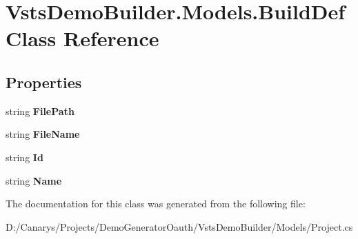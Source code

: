 \hypertarget{class_vsts_demo_builder_1_1_models_1_1_build_def}{}\section{Vsts\+Demo\+Builder.\+Models.\+Build\+Def Class Reference}
\label{class_vsts_demo_builder_1_1_models_1_1_build_def}
\subsection*{Properties}
\begin{DoxyCompactItemize}
\item 
\mbox{\label{class_vsts_demo_builder_1_1_models_1_1_build_def_a7807b5c73b1a48f22a056d025edcc7f8}} 
string {\bfseries File\+Path}
\item 
\mbox{\label{class_vsts_demo_builder_1_1_models_1_1_build_def_ac1f8bd359a21b8d9d0dc8a4712bcde23}} 
string {\bfseries File\+Name}
\item 
\mbox{\label{class_vsts_demo_builder_1_1_models_1_1_build_def_ab9a4e1088379f47f026efb64855e5d72}} 
string {\bfseries Id}
\item 
\mbox{\label{class_vsts_demo_builder_1_1_models_1_1_build_def_a373db5f3de494cb95ca3c2e7c8b18f2e}} 
string {\bfseries Name}
\end{DoxyCompactItemize}


The documentation for this class was generated from the following file\+:\begin{DoxyCompactItemize}
\item 
D\+:/\+Canarys/\+Projects/\+Demo\+Generator\+Oauth/\+Vsts\+Demo\+Builder/\+Models/Project.\+cs\end{DoxyCompactItemize}
